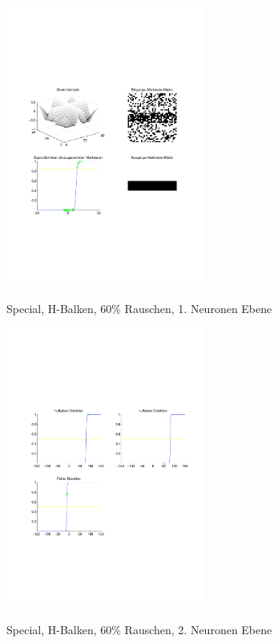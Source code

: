 \begin{figure}[hbt]
	\begin{minipage}[c]{\textwidth}
		\centering
       	\includegraphics[trim=71 213 43 212, clip, width=0.58\textwidth]{./Bilder/Auswertung/Endergebnis/TypeSpecial_Rauschen60_H_Line_Layer1}
		\caption{Special, H-Balken, 60\% Rauschen, 1. Neuronen Ebene}
		\label{Special_H_60_1}
		\vfill
		\includegraphics[trim=71 213 43 212, clip, width=0.58\textwidth]{./Bilder/Auswertung/Endergebnis/TypeSpecial_Rauschen60_H_Line_Layer2}
		\caption{Special, H-Balken, 60\% Rauschen, 2. Neuronen Ebene}
		\label{Special_H_60_2}
	\end{minipage}
\end{figure}

